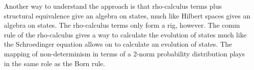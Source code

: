 Another way to understand the approach is that rho-calculus terms plus
structural equivalence give an algebra on states, much like Hilbert
spaces gives an algebra on states. The rho-calculus terms only form a
rig, however. The comm rule of the rho-calculus gives a way to
calculate the evolution of states much like the Schroedinger equation
allows on to calculate an evolution of states. The mapping of
non-determinism in terms of a 2-norm probability distribution plays in
the same role as the Born rule.


